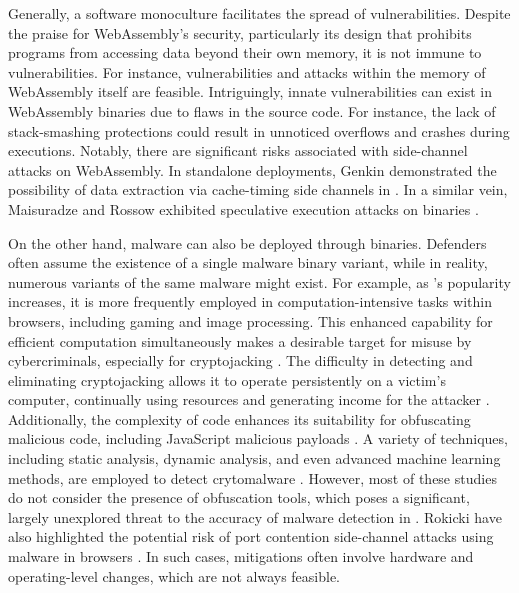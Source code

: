 Generally, a software monoculture facilitates the spread of vulnerabilities.
Despite the praise for WebAssembly's security, particularly its design that prohibits programs from accessing data beyond their own memory, it is not immune to vulnerabilities. 
For instance, vulnerabilities and attacks within the memory of WebAssembly itself are feasible\cite{usenixWasm2020}. 
Intriguingly, innate vulnerabilities can exist in WebAssembly binaries due to flaws in the source code. 
For instance, the lack of stack-smashing protections could result in unnoticed overflows and crashes during \Wasm executions\cite{DeRoover2022}. 
Notably, there are significant risks associated with side-channel attacks on WebAssembly. 
In standalone deployments, Genkin \etal demonstrated the possibility of data extraction via cache-timing side channels in \Wasm \cite{Genkin2018DrivebyKC}. 
In a similar vein, Maisuradze and Rossow exhibited speculative execution attacks on \Wasm binaries \cite{ret2spec}.


On the other hand, malware can also be deployed through \Wasm binaries. 
Defenders often assume the existence of a single malware binary variant, while in reality, numerous variants of the same malware might exist. 
For example, as \Wasm's popularity increases, it is more frequently employed in computation-intensive tasks within browsers, including gaming and image processing. 
This enhanced capability for efficient computation simultaneously makes \Wasm a desirable target for misuse by cybercriminals, especially for cryptojacking \cite{10.1145/3339252.3339261}. 
The difficulty in detecting and eliminating cryptojacking allows it to operate persistently on a victim's computer, continually using resources and generating income for the attacker \cite{9566204}. 
Additionally, the complexity of \Wasm code enhances its suitability for obfuscating malicious code, including JavaScript malicious payloads \cite{wobfuscator}. 
A variety of techniques, including static analysis, dynamic analysis, and even advanced machine learning methods, are employed to detect \Wasm crytomalware \cite{Minesweeper,MinerRay,MINOS,SEISMIC,RAPID,Outguard}. 
However, most of these studies do not consider the presence of obfuscation tools, which poses a significant, largely unexplored threat to the accuracy of malware detection in \Wasm. 
Rokicki \etal have also highlighted the potential risk of port contention side-channel attacks using \Wasm malware in browsers \cite{10.1145/3488932.3517411}. 
In such cases, mitigations often involve hardware and operating-level changes, which are not always feasible.




